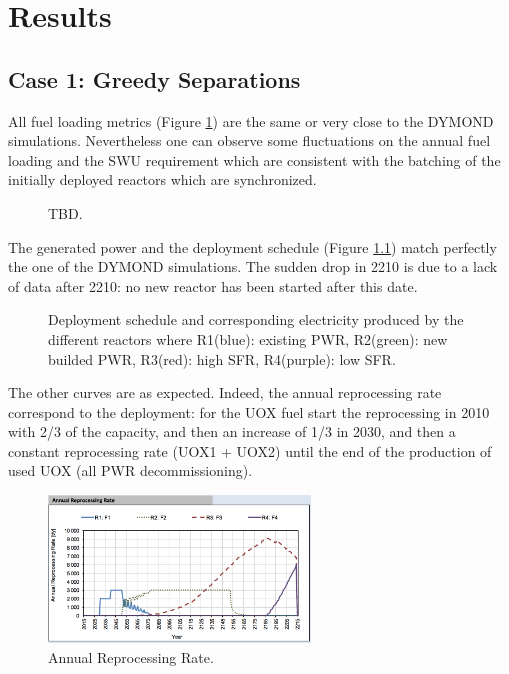 \documentclass[12pt]{article}
\begin{document}
\section{Results}

\subsection{Case 1: Greedy Separations}

All fuel loading metrics (Figure \ref{fig:RessourceUsed}) are the same or very
close to the DYMOND simulations. Nevertheless one can observe some
fluctuations on the annual fuel loading and the SWU requirement which are
consistent with the batching of the initially deployed reactors which are
synchronized.

\begin{figure}[h!]
    \centering
    \caption{TBD.\label{fig:RessourceUsed} }
\end{figure}

The generated power and the deployment schedule (Figure \ref{})  match perfectly
the one of the DYMOND simulations. The sudden drop in 2210 is due to a lack of
data after 2210: no new reactor has been started after this date.

\begin{figure}[h!]
    \centering
    \caption{Deployment schedule and corresponding
    electricity produced by the different reactors
    where R1(blue): existing PWR, R2(green): new
    builded PWR, R3(red): high SFR, R4(purple): low
    SFR.\label{fig:deployment_bis} }
\end{figure}


The other curves are as expected. Indeed, the annual reprocessing rate
correspond to the deployment:  for the UOX fuel start the reprocessing in 2010
with 2/3 of the capacity, and then an increase of 1/3 in 2030, and then a
constant reprocessing rate (UOX1 + UOX2) until the end of the production of
used UOX (all PWR decommissioning).


\begin{figure}[h!]
    \centering
    \includegraphics[width=0.62\textwidth]	{img/AnnualReprocessingRate_1}
    \caption{Annual Reprocessing Rate.}
    \label{fig:reprocessing_1}
\end{figure}
\end{document}
